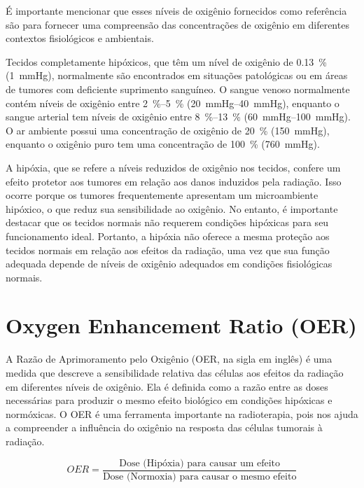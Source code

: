 \documentclass[11pt,a4paper]{article}
\begin{document}
	É importante mencionar que esses níveis de oxigênio fornecidos como referência são para fornecer uma compreensão das concentrações de oxigênio em diferentes contextos fisiológicos e ambientais. 
	
	Tecidos completamente hipóxicos, que têm um nível de oxigênio de \SI{0.13}{\percent} (\SI{1}{\mmHg}), normalmente são encontrados em situações patológicas ou em áreas de tumores com deficiente suprimento sanguíneo. O sangue venoso normalmente contém níveis de oxigênio entre \SIrange{2}{5}{\percent} (\SIrange{20}{40}{\mmHg}), enquanto o sangue arterial tem níveis de oxigênio entre \SIrange{8}{13}{\percent} (\SIrange{60}{100}{\mmHg}). O ar ambiente possui uma concentração de oxigênio de \SI{20}{\percent} (\SI{150}{\mmHg}), enquanto o oxigênio puro tem uma concentração de \SI{100}{\percent} (\SI{760}{\mmHg}).

	A hipóxia, que se refere a níveis reduzidos de oxigênio nos tecidos, confere um efeito protetor aos tumores em relação aos danos induzidos pela radiação. Isso ocorre porque os tumores frequentemente apresentam um microambiente hipóxico, o que reduz sua sensibilidade ao oxigênio. No entanto, é importante destacar que os tecidos normais não requerem condições hipóxicas para seu funcionamento ideal. Portanto, a hipóxia não oferece a mesma proteção aos tecidos normais em relação aos efeitos da radiação, uma vez que sua função adequada depende de níveis de oxigênio adequados em condições fisiológicas normais.

\section{Oxygen Enhancement Ratio (OER)}

	A Razão de Aprimoramento pelo Oxigênio (OER, na sigla em inglês) é uma medida que descreve a sensibilidade relativa das células aos efeitos da radiação em diferentes níveis de oxigênio. Ela é definida como a razão entre as doses necessárias para produzir o mesmo efeito biológico em condições hipóxicas e normóxicas. O OER é uma ferramenta importante na radioterapia, pois nos ajuda a compreender a influência do oxigênio na resposta das células tumorais à radiação.

	\begin{equation}
		OER = \frac{\text{Dose (Hipóxia) para causar um efeito}}{\text{Dose (Normoxia) para causar o mesmo efeito}}
	\end{equation}

	\
\end{document}
